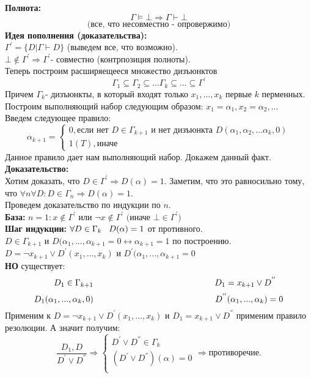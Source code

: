 \textbf{Полнота:}
\[\Gamma \vDash \bot \Rightarrow \Gamma \vdash \bot\]
\[\text{(все, что несовместно - опровержимо)}\]
\textbf{Идея пополнения (доказательства):}\\
$\Gamma^{'}= \{D|\Gamma \vdash D\}$ (выведем все, что возможно).\\
$\bot \notin \Gamma^{'} \Rightarrow \Gamma^{'}$- совместно (контрпозиция полноты).\\
Теперь построим расширяещееся множество дизъюнктов 
\[
\Gamma_1 \subseteq \Gamma_2\subseteq ... \Gamma_k \subseteq...\subseteq \Gamma^{'}
\]
Причем $\Gamma_k$- дизъюнкты, в который входят только $x_1,...,x_k$ первые $k$ перменных.\\
Построим выполняющий набор следующим образом: $x_1=\alpha_1,x_2=\alpha_2,... $\\
Введем следующее правило:
\[
\alpha_{k+1}= 
\begin{cases}
0, \text{если нет } D\in \Gamma_{k+1} \text{ и нет дизъюнкта } D(\alpha_1 , \alpha_2 , ... \alpha_k , 0)\\
1 (T), \text{иначе}
\end{cases}
\]
Данное правило дает нам выполняющий набор. Докажем данный факт.\\
\newpage
\textbf{Доказательство:}\\
Хотим доказать, что $D\in \Gamma^{'}\Rightarrow D(\alpha)=1$. Заметим, что это равносильно тому, что $\forall n \forall D: D\in \Gamma_n \Rightarrow D(\alpha)=1$.\\
Проведем доказательство по индукции по $n$.\\
\textbf{База:} $n=1 : x\notin \Gamma^{'} \text{ или } \neg x \notin \Gamma^{'} 
\textbf{ (иначе } \bot \in \Gamma^{'})$\\
\textbf{Шаг индукции:} $\forall D \in \Gamma_k \hspace{3mm} D(\alpha)=1$ от противного.\\
$D \in \Gamma_{k+1}$ и $D(\alpha_1,...,\alpha_{k+1}=0 \leftrightarrow \alpha_{k+1} = 1$ по построению.\\
$D = \neg x_{k+1} \vee D^{'}(x_1,...,x_k)$ и $D^{'}(\alpha_1,...,\alpha_{k+1}=0$\\
\textbf{НО} существует:\\
\[\hspace{5mm} D_1 \in \Gamma_{k+1} \hspace{50mm} D_1= x_{k+1} \vee D^{''}\]
\[
D_1(\alpha_1,...,\alpha_k,0) \hspace{50mm} D^{''}(\alpha_1,...,\alpha_k)=0
\]
Применим к $D = \neg x_{k+1} \vee D^{'}(x_1,...,x_k)$ и $D_1= x_{k+1} \vee D^{''}$ применим правило резолюции. А значит получим:
\[
\frac{D_1,D}{D^{'}\vee D^{''}} \Rightarrow
\begin{cases}
D^{'}\vee D^{''} \in \Gamma_k\\
(D^{'}\vee D^{''})(\alpha)=0\\
\end{cases}
\Rightarrow \textbf{противоречие.}
\]
